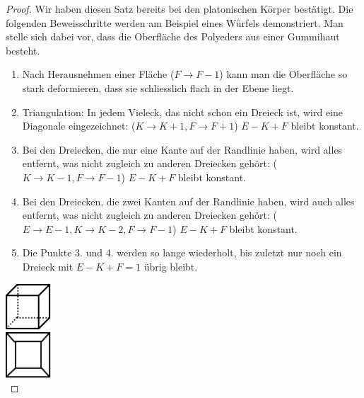 \documentclass[%
11pt,%
twoside,%
titlepage,%
swissgerman,%
headsepline%
]{scrartcl}
\theoremstyle{definition}
\theoremstyle{plain}
\begin{document}
\begin{proof}
Wir haben diesen Satz bereits bei den platonischen K\"orper best\"atigt. Die folgenden Beweisschritte werden am Beispiel eines W\"urfels demonstriert. Man stelle sich dabei vor, dass die Oberfl\"ache des Polyeders aus einer Gummihaut besteht.

\begin{minipage}{0.618\textwidth}
\begin{enumerate}
\item Nach Herausnehmen einer Fl\"ache ($F\rightarrow F-1$) kann man die Oberfl\"ache so stark deformieren, dass sie schliesslich flach in der Ebene liegt.\\
\item Triangulation: In jedem Vieleck, das nicht schon ein Dreieck ist, wird eine Diagonale eingezeichnet: ($K\rightarrow K+1, F\rightarrow F+1$) $E-K+F$ bleibt konstant.\\
\item Bei den Dreiecken, die nur eine Kante auf der Randlinie haben, wird alles entfernt, was nicht zugleich zu anderen Dreiecken geh\"ort: ($K\rightarrow K-1, F\rightarrow  F-1$) $E-K+F$ bleibt konstant.\\
\item Bei den Dreiecken, die zwei Kanten auf der Randlinie haben, wird auch alles entfernt, was nicht zugleich zu anderen Dreiecken geh\"ort: ($E\rightarrow  E-1, K\rightarrow  K-2, F\rightarrow  F-1$) $E-K+F$ bleibt konstant.\\
\item Die Punkte 3. und 4. werden so lange wiederholt, bis zuletzt nur noch ein Dreieck mit $E-K+F=1$ \"ubrig bleibt.\\
\end{enumerate}
\end{minipage}
\hspace*{2cm}
\begin{minipage}{1.7cm}
\includegraphics[width=1.7cm]{pictures/wuerf1}\\[3ex]
\includegraphics[width=1.7cm]{pictures/wuerf2}\\[4ex]

\end{minipage}
\end{proof}
\end{document}
